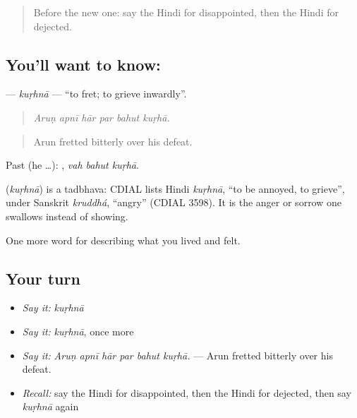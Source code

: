 \label{lesson:HI-C455-kurhna}



\begin{quote}
Before the new one: say the Hindi for disappointed, then the Hindi for dejected.
\end{quote}

\subsection*{You'll want to know: }
\textbf{} — \emph{kuṛhnā} — \textquotedblleft{}to fret; to grieve inwardly\textquotedblright{}.

\begin{quote}
     
\end{quote}

\begin{quote}
\emph{Aruṇ apnī hār par bahut kuṛhā.}
\end{quote}

\begin{quote}
Arun fretted bitterly over his defeat.
\end{quote}

Past (he …):   , \emph{vah bahut kuṛhā}.

\begin{cousinweb}
\textbf{} (\emph{kuṛhnā}) is a tadbhava: CDIAL lists Hindi \emph{kuṛhnā}, \textquotedblleft{}to be annoyed, to grieve\textquotedblright{}, under Sanskrit \emph{kruddhá}, \textquotedblleft{}angry\textquotedblright{} (CDIAL 3598). It is the anger or sorrow one swallows instead of showing.
\end{cousinweb}

\begin{grammarlens}[title={What you've built}]
One more word for describing what you lived and felt.
\end{grammarlens}

\subsection*{Your turn}
\begin{itemize}
\raggedright
  \item \emph{Say it:} \emph{kuṛhnā}
  \item \emph{Say it:} \emph{kuṛhnā}, once more
  \item \emph{Say it:} \emph{Aruṇ apnī hār par bahut kuṛhā.} — Arun fretted bitterly over his defeat.
  \item \emph{Recall:} say the Hindi for disappointed, then the Hindi for dejected, then say \emph{kuṛhnā} again
\end{itemize}


